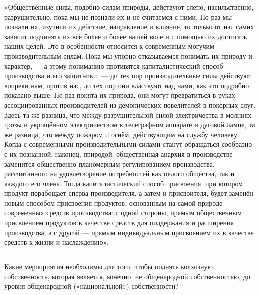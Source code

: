 \documentclass[12pt, a4paper, openany]{book}
\begin{document}
«Общественные силы, подобно силам природы, действуют слепо, насильственно, разрушительно, пока мы не познали их и не считаемся с ними. Но раз мы познали их, изучили их действие, направление и влияние, то только от нас самих зависит подчинять их всё более и более нашей воле и с помощью их достигать наших целей. Это в особенности относится к современным могучим производительным силам. Пока мы упорно отказываемся понимать их природу и характер, — а этому пониманию противятся капиталистический способ производства и его защитники, — до тех пор производительные силы действуют вопреки нам, против нас, до тех пор они властвуют над нами, как это подробно показано выше. Но раз понята их природа, они могут превратиться в руках ассоциированных производителей из демонических повелителей в покорных слуг. Здесь та же разница, что между разрушительной силой электричества в молниях грозы и укрощённом электричеством в телеграфном аппарате и дуговой лампе, та же разница, что между пожаром и огнём, действующим на службу человеку. Когда с современными производительными силами станут обращаться сообразно с их познанной, наконец, природой, общественная анархия в производстве заменится общественно-планомерным регулированием производства, рассчитанного на удовлетворение потребностей как целого общества, так и каждого его члена. Тогда капиталистический способ присвоения, при котором продукт порабощает сперва производителя, а затем и присвоителя, будет заменён новым способом присвоения продуктов, основанным на самой природе современных средств производства: с одной стороны, прямым общественным присвоением продуктов в качестве средств для поддержания и расширения производства, а с другой — прямым индивидуальным присвоением их в качестве средств к жизни и наслаждению».



\vspace{0.4cm}



\subsection[2. Вопрос о мерах повышения колхозной собственности до уровня общенародной собственности]{}



Какие мероприятия необходимы для того, чтобы поднять колхозную собственность, которая является, конечно, не общенародной собственностью, до уровня общенародной («национальной») собственности?
\end{document}
